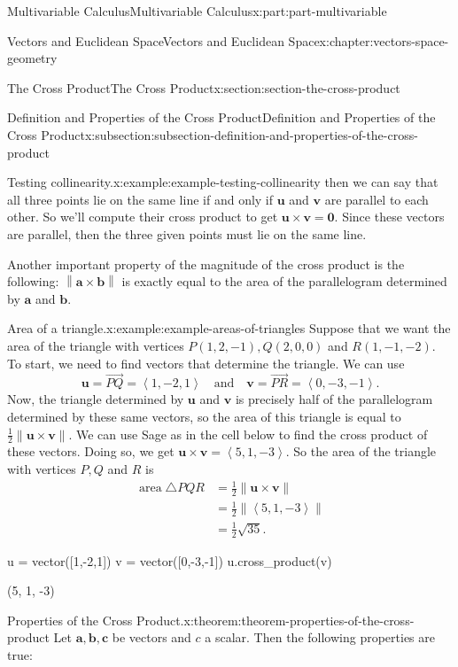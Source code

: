 \documentclass[twoside,10pt,]{tufte-book}
\numberwithin{equation}{part}
\newcommand{\norm}[1]{\left\| #1 \right\|}
\newcommand{\dotprod}[1]{\left\langle #1 \right\rangle}
\begin{document}
\begin{partptx}{Multivariable Calculus}{}{Multivariable Calculus}{}{}{x:part:part-multivariable}
\begin{chapterptx}{Vectors and Euclidean Space}{}{Vectors and Euclidean Space}{}{}{x:chapter:vectors-space-geometry}
\begin{sectionptx}{The Cross Product}{}{The Cross Product}{}{}{x:section:section-the-cross-product}
\begin{subsectionptx}{Definition and Properties of the Cross Product}{}{Definition and Properties of the Cross Product}{}{}{x:subsection:subsection-definition-and-properties-of-the-cross-product}
\begin{example}{Testing collinearity.}{x:example:example-testing-collinearity}
then we can say that all three points lie on the same line if and only if \(\mathbf{u}\) and \(\mathbf{v}\) are parallel to each other. So we'll compute their cross product to get \(\mathbf{u}\times\mathbf{v} = \mathbf{0}\). Since these vectors are parallel, then the three given points must lie on the same line.%
\end{example}
Another important property of the magnitude of the cross product is the following: \(\norm{\mathbf{a}\times\mathbf{b}}\) is exactly equal to the area of the parallelogram determined by \(\mathbf{a}\) and \(\mathbf{b}\).%
\begin{example}{Area of a triangle.}{x:example:example-areas-of-triangles}%
Suppose that we want the area of the triangle with vertices \(P(1,2,-1), Q(2,0,0)\) and \(R(1,-1,-2)\). To start, we need to find vectors that determine the triangle. We can use%
%
\begin{equation*}
\mathbf{u} = \vec{PQ} = \dotprod{1,-2,1}\quad\text{and}\quad\mathbf{v} = \vec{PR} = \dotprod{0,-3,-1}.
\end{equation*}
Now, the triangle determined by \(\mathbf{u}\) and \(\mathbf{v}\) is precisely half of the parallelogram determined by these same vectors, so the area of this triangle is equal to \(\frac{1}{2}\norm{\mathbf{u}\times\mathbf{v}}\). We can use Sage as in the cell below to find the cross product of these vectors. Doing so, we get \(\mathbf{u}\times\mathbf{v} = \dotprod{5,1,-3}.\) So the area of the triangle with vertices \(P,Q\) and \(R\) is%
%
\begin{align*}
\operatorname{area} \triangle PQR & = \frac{1}{2}\norm{\mathbf{u}\times\mathbf{v}} \\
& = \frac{1}{2}\norm{\dotprod{5,1,-3}} \\
& = \frac{1}{2}\sqrt{35}. 
\end{align*}
\end{example}
\begin{sageinput}
u = vector([1,-2,1])
v = vector([0,-3,-1])
u.cross_product(v)
\end{sageinput}
\begin{sageoutput}
(5, 1, -3)
\end{sageoutput}
\begin{theorem}{Properties of the Cross Product.}{}{x:theorem:theorem-properties-of-the-cross-product}%
%
Let \(\mathbf{a},\mathbf{b},\mathbf{c}\) be vectors and \(c\) a scalar. Then the following properties are true:%
%
\begin{multicols}{2}

\end{multicols}
\end{theorem}
\end{subsectionptx}
\end{sectionptx}
\end{chapterptx}
\end{partptx}
\end{document}
